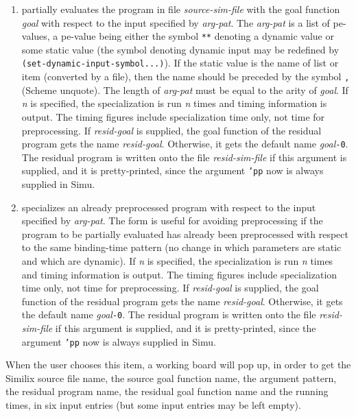 \begin{sloppypar}
\begin{enumerate}
\item partially evaluates the program in file {\it source-sim-file} with the
   goal function {\it goal} with respect to the input specified by
   {\it arg-pat}.  The {\it arg-pat} is a list of pe-values, a
   pe-value being either the symbol {\tt ***} denoting a dynamic value
   or some static value (the symbol denoting dynamic input may be
   redefined by {\tt (set-dynamic-input-symbol...)}). If the static
   value is the name of list or item (converted by a file), then the
   name should be preceded by the symbol {\tt ,} (Scheme unquote). The
   length of {\it arg-pat} must be equal to the arity of {\it
   goal}. If {\it n} is specified, the specialization is run {\it n}
   times and timing information is output.  The timing figures include
   specialization time only, not time for preprocessing. If {\it
   resid-goal} is supplied, the goal function of the residual program
   gets the name {\it resid-goal}. Otherwise, it gets the default name
   {\it goal}{\tt -0}. The residual program is written onto the file
   {\it resid-sim-file} if this argument is supplied, and it is
   pretty-printed, since the argument {\tt 'pp} now is always supplied
   in Simu.

\item specializes an already preprocessed program with respect to the
   input specified by {\it arg-pat}.  The form is useful for avoiding
   preprocessing if the program to be partially evaluated has already
   been preprocessed with respect to the same binding-time pattern (no
   change in which parameters are static and which are dynamic). If
   {\it n} is specified, the specialization is run {\it n} times and
   timing information is output. The timing figures include
   specialization time only, not time for preprocessing.  If {\it
   resid-goal} is supplied, the goal function of the residual program
   gets the name {\it resid-goal}.  Otherwise, it gets the default
   name {\it goal}{\tt -0}.  The residual program is written onto the
   file {\it resid-sim-file} if this argument is supplied, and it is
   pretty-printed, since the argument {\tt 'pp} now is always supplied
   in Simu.
\end{enumerate}
\medskip
\par
   When the user chooses this item, a working board will pop up, in
order to get the Similix source file name, the source goal function
name, the argument pattern, the residual program name, the residual
goal function name and the running times, in six input entries (but
some input entries may be left empty).




\end{sloppypar}
